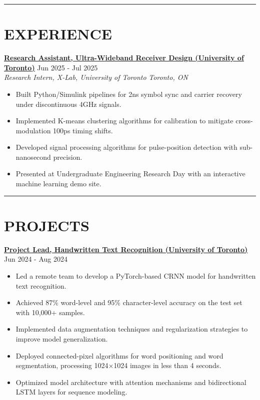 \documentclass[letterpaper,10pt]{article}
\begin{document}
\noindent\rule{\linewidth}{1pt}

\section*{\textbf{EXPERIENCE}}

\noindent\href{https://github.com/Ken-2511/ppm-psk-visualize}
{\uline{\textbf{Research Assistant, Ultra-Wideband Receiver Design (University of Toronto)}}} \hfill Jun 2025 - Jul 2025\\
\textit{Research Intern, X-Lab, University of Toronto} \hfill \textit{Toronto, ON}
\begin{itemize}[leftmargin=0.2in]
    \item Built Python/Simulink pipelines for 2ns symbol sync and carrier recovery under discontinuous 4GHz signals.
	\item Implemented K-means clustering algorithms for calibration to mitigate cross-modulation 100ps timing shifts.
    \item Developed signal processing algorithms for pulse-position detection with sub-nanosecond precision.
    \item Presented at Undergraduate Engineering Research Day with an interactive machine learning demo site.
\end{itemize}

\noindent\rule{\linewidth}{1pt}

\section*{\textbf{PROJECTS}}

\noindent\href{https://github.com/Ken-2511/HandwritingRecognition}{\uline{
\textbf{Project Lead, Handwritten Text Recognition (University of Toronto)}}} \hfill Jun 2024 - Aug 2024
\begin{itemize}[leftmargin=0.2in]
    \item Led a remote team to develop a PyTorch-based CRNN model for handwritten text recognition.
    \item Achieved 87\% word-level and 95\% character-level accuracy on the test set with 10,000+ samples.
    \item Implemented data augmentation techniques and regularization strategies to improve model generalization.
    \item Deployed connected-pixel algorithms for word positioning and word segmentation, processing 1024$\times$1024 images in less than 4 seconds.
    \item Optimized model architecture with attention mechanisms and bidirectional LSTM layers for sequence modeling.
\end{itemize}
\end{document}
